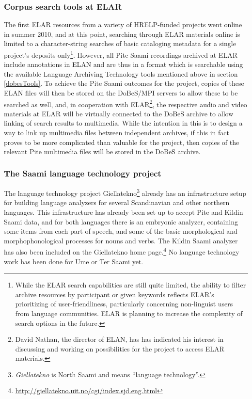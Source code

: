 \documentclass[a4paper,12pt]{article}
\begin{document}
\subsubsection{Corpus search tools at ELAR}\label{elarTools}
The first ELAR resources from a variety of HRELP-funded projects went online in summer 2010, and at this point, searching through ELAR materials online is limited to a character-string searches of basic cataloging metadata for a single project's deposits only\footnote{While the ELAR search capabilities are still quite limited, the ability to filter archive resources by participant or given keywords reflects ELAR's prioritizing of user-friendliness, particularly concerning non-linguist users from language communities. ELAR is planning to increase the complexity of search options in the future.}. However, all Pite Saami recordings archived at ELAR include annotations in ELAN and are thus in a format which is searchable using the available Language Archiving Technology tools mentioned above in section \ref{dobesTools}. To achieve the Pite Saami outcomes for the project, copies of these ELAN files will then be stored on the DoBeS/MPI servers to allow these to be searched as well, and, in cooperation with ELAR\footnote{David Nathan, the director of ELAN, has has indicated his interest in discussing and working on possibilities for the project to access ELAR materials.}, the respective audio and video materials at ELAR will be virtually connected to the DoBeS archive to allow linking of search results to multimedia. While the intention in this is to design a way to link up multimedia files between independent archives, if this in fact proves to be more complicated than valuable for the project, then copies of the relevant Pite multimedia files will be stored in the DoBeS archive.

\subsubsection{The Saami language technology project}

The language technology project Giellatekno\footnote{\textit{Giellatekno} is North Saami and means “language technology”.} already has an infrastructure setup for building language analyzers for several Scandinavian and other northern languages. This infrastructure has already been set up to accept Pite and Kildin Saami data, and for both languages there is an embryonic analyzer, containing some items from each part of speech, and some of the basic morphological and morphophonological processes for nouns and verbs. The Kildin Saami analyzer has also been included on the Giellatekno home page.\footnote{\url{http://giellatekno.uit.no/cgi/index.sjd.eng.html}} No language technology work has been done for Ume or Ter Saami yet.
\end{document}
